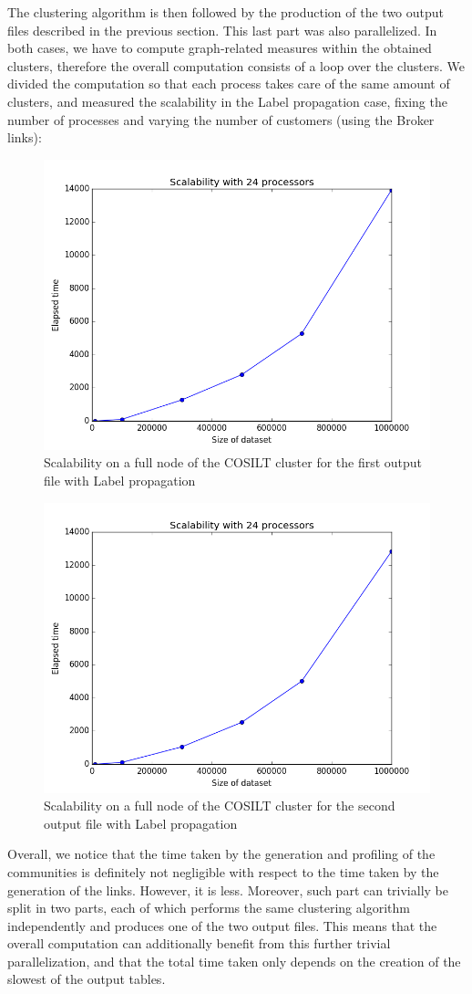 \documentclass[a4paper,11pt]{book}
\begin{document}
The clustering algorithm is then followed by the production of the two output files described in the previous section. This last part was also parallelized. In both cases, we have to compute graph-related measures within the obtained clusters, therefore the overall computation consists of a loop over the clusters. We divided the computation so that each process takes care of the same amount of clusters, and measured the scalability in the Label propagation case, fixing the number of processes and varying the number of customers (using the Broker links):
  \begin{figure}[H]
\centering
\includegraphics[height=6.125 cm,width=8.75 cm]{24cores_table1.png}
\caption{Scalability on a full node of the COSILT cluster for the first output file with Label propagation} \label{fig:tab1}
\end{figure}
 \begin{figure}[H]
\centering
\includegraphics[height=6.125 cm,width=8.75 cm]{24cores_table4.png}
\caption{Scalability on a full node of the COSILT cluster for the second output file with Label propagation} \label{fig:tab4}
\end{figure}
Overall, we notice that the time taken by the generation and profiling of the communities is definitely not negligible with respect to the time taken by the generation of the links. However, it is less.
Moreover, such part can trivially be split in two parts, each of which performs the same clustering algorithm independently and produces one of the two output files. This means that the overall computation can additionally benefit from this further trivial parallelization, and that the total time taken only depends on the creation of the slowest of the output tables.\\
\end{document}
